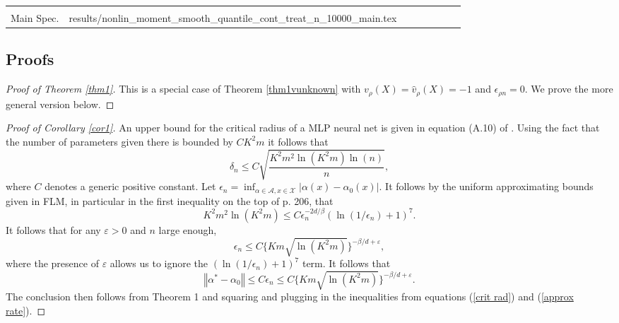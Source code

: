 \documentclass[aos]{imsart}
\makeatletter
\numberwithin{equation}{section}
\theoremstyle{plain}
\theoremstyle{remark}
\newcommand\tableinput[1]{\@@input #1 }
\makeatother
\begin{document}
\begin{table}[]
\begin{tabular}{r*{7}{c}}
    \addlinespace
    \multicolumn{8}{l}{$n = 10,000$} \\
    Main Spec. & \tableinput{results/nonlin_moment_smooth_quantile_cont_treat_n_10000_main.tex}
    \bottomrule
    \end{tabular}
\end{table}

\clearpage

\begin{appendix}
\section{Proofs}
\begin{proof}[Proof of Theorem \ref{thm1}]
    This is a special case of Theorem \ref{thm1vunknown} with $v_\rho(X) = \hat{v}_\rho(X) = -1$ and $\epsilon_{\rho n} = 0$. We prove the more general version below.
\end{proof}

\begin{proof}[Proof of Corollary \ref{cor1}]
An upper bound for the critical radius of a MLP
neural net is given in equation (A.10) of \cite{farrell2021deep}. Using the fact that the number of parameters given there is bounded by
$CK^{2}m$ it follows that
\begin{equation}
\delta_{n}\leq C\sqrt{\frac{K^{2}m^{2}\ln(K^{2}m)\ln(n)}{n}},\label{crit rad}%
\end{equation}
where $C$ denotes a generic positive constant. Let $\epsilon_{n}=\inf
_{\alpha\in\mathcal{A},x\in\mathcal{X}}\left\vert \alpha(x)-\alpha
_{0}(x)\right\vert .$ It follows by the uniform approximating bounds given in
FLM, in particular in the first inequality on the top of p. 206, that%
\[
K^{2}m^{2}\ln(K^{2}m)\leq C\epsilon_{n}^{-2d/\beta}(\ln(1/\epsilon_{n}%
)+1)^{7}.
\]
It follows that for any $\varepsilon>0$ and $n$ large enough,
\[
\epsilon_{n}\leq C\{Km\sqrt{\ln(K^{2}m)}\}^{-\beta/d+\varepsilon},
\]
where the presence of $\varepsilon$ allows us to ignore the $(\ln
(1/\epsilon_{n})+1)^{7}$ term. It follows that%
\begin{equation}
\left\Vert \alpha^{\ast}-\alpha_{0}\right\Vert \leq C\epsilon_{n}\leq
C\{Km\sqrt{\ln(K^{2}m)}\}^{-\beta/d+\varepsilon}.\label{approx rate}%
\end{equation}
The conclusion then follows from Theorem 1 and squaring and plugging in the
inequalities from equations (\ref{crit rad}) and (\ref{approx rate}).
\end{proof}


\end{appendix}
\end{document}
